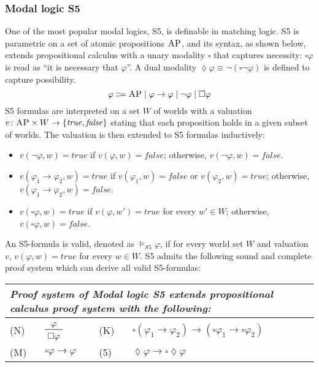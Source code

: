 \documentclass[acmsmall,review,anonymous]{acmart}
\newcommand{\imp}{\to}
\newcommand{\prule}[1]{\textsc{(#1)}}
\newcommand{\AP}{\textsc{AP}}
\newcommand{\true}{\mathit{true}}
\newcommand{\false}{\mathit{false}}
\newcommand{\always}{{\square}}
\newcommand{\eventually}{{\lozenge}}
\begin{document}
\subsubsection{Modal logic S5}
\label{sec_modal_logic_S5}
One of the most popular modal logics, S5, is definable in 
matching logic.
S5 is parametric on a set of atomic propositions $\AP$,
and 
its syntax, as shown below, extends propositional calculus with a unary modality
$\always$ that captures necessity:
$\always \varphi$ is read as ``it is necessary that $\varphi$''.
A dual modality $\eventually \varphi \equiv \neg (\always \neg \varphi)$
is defined to capture possibility.
\begin{equation*}
\varphi \Coloneqq
\AP \mid \varphi \imp \varphi
\mid \neg \varphi
\mid \always \varphi
\end{equation*}
S5 formulas are interpreted on a set $W$ of worlds
with a valuation $v \colon \AP \times W \to \{ \true, \false \}$
stating that each proposition holds in a given subset of worlds.
The valuation is then extended to S5 formulas inductively:
\begin{itemize}
\item $v(\neg \varphi, w) = \true$ if $v(\varphi, w) = \false$;
      otherwise,
      $v(\neg \varphi, w) = \false$.
\item $v(\varphi_1 \imp \varphi_2, w) = \true$
      if $v(\varphi_1, w) = \false$ or $v(\varphi_2, w) = \true$;
      otherwise,
      $v(\varphi_1 \imp \varphi_2, w) = \false$.
\item $v(\always \varphi, w) = \true$ if
      $v(\varphi, w') = \true$ for every $w' \in W$;
      otherwise,
      $v(\always \varphi, w) = \false$.
\end{itemize}
An S5-formula is valid, denoted as $\vDash_{S5} \varphi$, if for every 
world set $W$ and valuation $v$,
$v(\varphi, w) = \true$ for every $w \in W$.
S5 admits the following sound and complete proof system
which can derive all valid S5-formulas:
\begin{center}
\begin{tabular}{lm{5cm}ll}
\multicolumn{4}{l}{
\em 
Proof system of Modal logic S5 
extends propositional calculus proof system with the following:
}
\\\hline
\prule{N}
&
$\prftree{\varphi}{\always \varphi}$
&
\prule{K}
&
$\always(\varphi_1 \imp \varphi_2) 
 \imp (\always \varphi_1 \imp \always \varphi_2)$
\\
\prule{M}
&
$\always \varphi \imp \varphi$
&
\prule{5}
&
$\eventually \varphi \imp \always \eventually \varphi$
\end{tabular}
\end{center}
\end{document}
